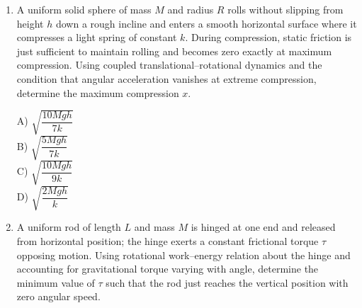 \documentclass[12pt]{article}
\begin{document}
\begin{enumerate}

\item A uniform solid sphere of mass \(M\) and radius \(R\) rolls without slipping from height \(h\) down a rough incline and enters a smooth horizontal surface where it compresses a light spring of constant \(k\). During compression, static friction is just sufficient to maintain rolling and becomes zero exactly at maximum compression. Using coupled translational–rotational dynamics and the condition that angular acceleration vanishes at extreme compression, determine the maximum compression \(x\).\\

\begin{center}
\end{center}

A) \(\sqrt{\dfrac{10Mgh}{7k}}\)\\

B) \(\sqrt{\dfrac{5Mgh}{7k}}\)\\

C) \(\sqrt{\dfrac{10Mgh}{9k}}\)\\

D) \(\sqrt{\dfrac{2Mgh}{k}}\)

\item A uniform rod of length \(L\) and mass \(M\) is hinged at one end and released from horizontal position; the hinge exerts a constant frictional torque \(\tau\) opposing motion. Using rotational work–energy relation about the hinge and accounting for gravitational torque varying with angle, determine the minimum value of \(\tau\) such that the rod just reaches the vertical position with zero angular speed.\\


\end{enumerate}
\end{document}
